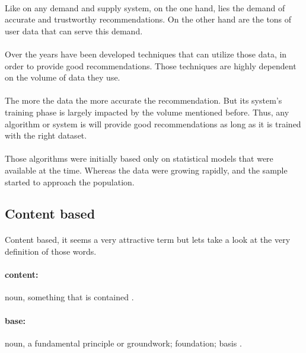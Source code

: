 \paragraph{}Like on any demand and supply system, on the one hand, lies the demand of accurate and trustworthy recommendations. On the other hand are the tons of user data that can serve this demand.
\paragraph{}Over the years have been developed techniques that can utilize those data, in order to provide good recommendations. Those techniques are highly dependent on the volume of data they use. 

\paragraph{}The more the data the more accurate the recommendation. But its system's training phase is largely impacted by the volume mentioned before. Thus, any algorithm or system is will provide good recommendations as long as it is trained with the right dataset.

\paragraph{} Those algorithms were initially based only on statistical models that were available at the time. Whereas the data were growing rapidly, and the sample started to approach the population.
\subsection{Content based}
\paragraph{} Content based, it seems a very attractive term but lets take a look at the very definition of those words.
\paragraph{content:} noun, something that is contained \cite{Dictionary.com2017}.
\paragraph{base:} noun, a fundamental principle or groundwork; foundation; basis \cite{Dictionary.com2017}.

